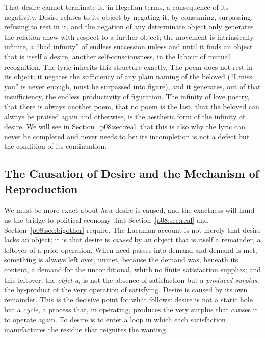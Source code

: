 That desire cannot terminate is, in Hegelian terms, a consequence of its negativity. Desire relates to its object by negating it, by consuming, surpassing, refusing to rest in it, and the negation of any determinate object only generates the relation anew with respect to a further object; the movement is intrinsically infinite, a ``bad infinity'' of endless succession unless and until it finds an object that is itself a desire, another self-consciousness, in the labour of mutual recognition. The lyric inherits this structure exactly. The poem does not rest in its object; it negates the sufficiency of any plain naming of the beloved (``I miss you'' is never enough, must be surpassed into figure), and it generates, out of that insufficiency, the endless productivity of figuration. The infinity of love poetry, that there is always another poem, that no poem is the last, that the beloved can always be praised again and otherwise, is the aesthetic form of the infinity of desire. We will see in Section~\ref{p08:sec:real} that this is also why the lyric can never be completed and never needs to be: its incompletion is not a defect but the condition of its continuation.

\subsection{The Causation of Desire and the Mechanism of Reproduction}\label{p08:sec:reproduction}

We must be more exact about \emph{how} desire is caused, and the exactness will hand us the bridge to political economy that Section~\ref{p08:sec:real} and Section~\ref{p08:sec:bigother} require. The Lacanian account is not merely that desire lacks an object; it is that desire is \emph{caused} by an object that is itself a remainder, a leftover of a prior operation. When need passes into demand and demand is met, something is always left over, unmet, because the demand was, beneath its content, a demand for the unconditional, which no finite satisfaction supplies; and this leftover, the \textit{objet a}, is not the absence of satisfaction but a \emph{produced surplus}, the by-product of the very operation of satisfying. Desire is caused by its own remainder. This is the decisive point for what follows: desire is not a static hole but a \emph{cycle}, a process that, in operating, produces the very surplus that causes it to operate again. To desire is to enter a loop in which each satisfaction manufactures the residue that reignites the wanting.

